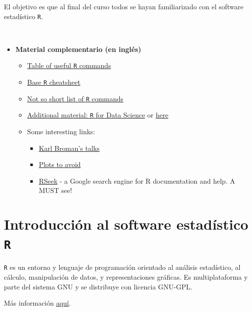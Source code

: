 \documentclass[]{book}
\begin{document}
El objetivo es que al final del curso todos se hayan familiarizado con
el software estadístico \texttt{R}.

~

\begin{itemize}
\item
  \textbf{Material complementario (en inglés)}

  \begin{itemize}
  \item
    \href{https://www.calvin.edu/~scofield/courses/m143/materials/RcmdsFromClass.pdf}{Table
    of useful \texttt{R} commands}
  \item
    \href{https://www.rstudio.com/wp-content/uploads/2016/10/r-cheat-sheet-3.pdf}{Base
    \texttt{R} cheatsheet}
  \item
    \href{http://www.webpages.uidaho.edu/~stevel/251/comR.pdf}{Not so
    short list of \texttt{R} commands}
  \item
    \href{http://r4ds.had.co.nz/}{Additional material: \texttt{R} for
    Data Science} or \href{http://courses.had.co.nz/}{here}
  \item
    Some interesting links:

    \begin{itemize}
    \item
      \href{http://kbroman.org/pages/talks.html}{Karl Broman's talks}
    \item
      \href{http://genomicsclass.github.io/book/pages/plots_to_avoid.html}{Plots
      to avoid}
    \item
      \href{http://rseek.org/}{RSeek} - a Google search engine for R
      documentation and help. A MUST see!
    \end{itemize}
  \end{itemize}
\end{itemize}

\chapter{\texorpdfstring{Introducción al software estadístico
\texttt{R}}{Introducción al software estadístico R}}\label{intro}

\texttt{R} es un entorno y lenguaje de programación orientado al
análisis estadístico, al cálculo, manipulación de datos, y
representaciones gráficas. Es multiplataforma y parte del sistema GNU y
se distribuye con licencia GNU-GPL.

Más información
\href{https://es.wikipedia.org/wiki/R_(lenguaje_de_programaci\%C3\%B3n)}{aquí}.
~
\end{document}
